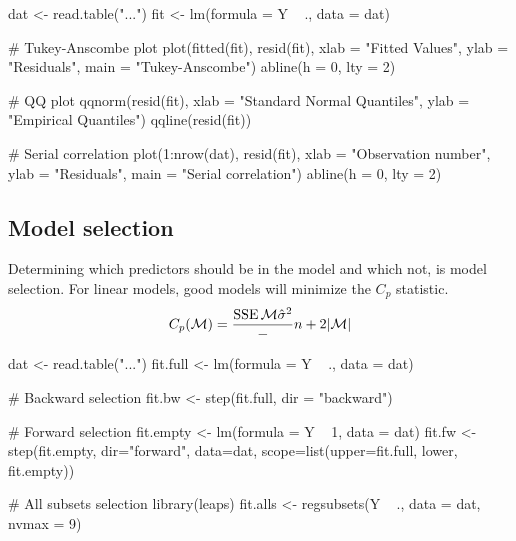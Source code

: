 \begin{code}
 dat <- read.table("...")
 fit <- lm(formula = Y ~ ., data = dat)
 
 # Tukey-Anscombe plot
 plot(fitted(fit), resid(fit), xlab = "Fitted Values", ylab = "Residuals", main = "Tukey-Anscombe")
 abline(h = 0, lty = 2)
 
 # QQ plot
 qqnorm(resid(fit), xlab = "Standard Normal Quantiles", ylab = "Empirical Quantiles")
 qqline(resid(fit))
 
 # Serial correlation
 plot(1:nrow(dat), resid(fit), xlab = "Observation number", ylab = "Residuals", main = "Serial correlation")
 abline(h = 0, lty = 2) 
\end{code}

\subsection{Model selection}
\begin{theory}
 Determining which predictors should be in the model and which not, is model selection. For linear models, good models will minimize the $C_p$ statistic.
 \begin{equation*}
  C_p(\mathcal{M}) = \frac{\operatorname{SSE}{\mathcal{M}}{\hat{\sigma}^2}} - n + 2 |\mathcal{M}|
 \end{equation*}
\end{theory}

\begin{code}
 dat <- read.table("...")
 fit.full <- lm(formula = Y ~ ., data = dat)
 
 # Backward selection
 fit.bw <- step(fit.full, dir = "backward")
 
 # Forward selection
 fit.empty <- lm(formula = Y ~ 1, data = dat)
 fit.fw <- step(fit.empty, dir="forward", data=dat, scope=list(upper=fit.full, lower, fit.empty))

 # All subsets selection
 library(leaps)
 fit.alls <- regsubsets(Y ~ ., data = dat, nvmax = 9) 
\end{code}
